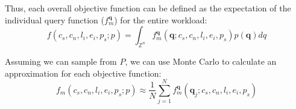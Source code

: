 Thus, each overall objective function can be defined as the expectation of the individual query function ($f_m^{\mathbf{q}}$) for the entire workload:
\begin{equation}
    f(c_s, c_n, l_i, e_i, p_s; p) = \int_{\mathbb{Z}^n} f_m^\mathbf{q}(\mathbf{q} ; c_s, c_n, l_i, e_i, p_s) p(\mathbf{q}) dq
\end{equation}

Assuming we can sample from $P$, we can use Monte Carlo to calculate an approximation for each objective function:
\begin{equation}
    f_m(c_s, c_n, l_i, e_i, p_s; p) \approx \frac{1}{N} \sum_{j=1}^N f_m^{\mathbf{q}}({\mathbf{q}}_j ; c_s, c_n, l_i, e_i, p_s)
\end{equation}